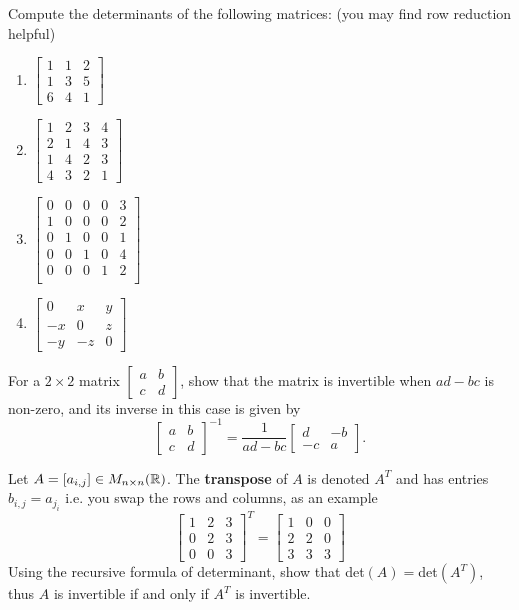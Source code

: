 \begin{exerciselist}
	\item Compute the determinants of the following matrices: (you may find row reduction helpful) \begin{enumerate}
		\item $\begin{bmatrix}
			1&1&2\\1&3&5\\6&4&1
		\end{bmatrix}$
		\item $\begin{bmatrix}
			1&2&3&4\\2&1&4&3\\1&4&2&3\\4&3&2&1
		\end{bmatrix}$
		\item $\begin{bmatrix}
			0&0&0&0&3\\
			1&0&0&0&2\\
			0&1&0&0&1\\
			0&0&1&0&4\\
			0&0&0&1&2\\
		\end{bmatrix}$
		\item $\begin{bmatrix}
			0&x&y\\-x&0&z\\-y&-z&0
		\end{bmatrix}$
	\end{enumerate}
	\item For a $2\times 2$ matrix $\begin{bmatrix}
		a&b\\c&d
	\end{bmatrix}$, show that the matrix is invertible when $ad-bc$ is non-zero, and its inverse in this case is given by \[
	\begin{bmatrix}
		a&b\\c&d
	\end{bmatrix}^{-1}=
	\frac{1}{ad-bc}\begin{bmatrix}
		d & -b\\-c& a
	\end{bmatrix}.
	\]
	\item Let $A=[a_{i,j}]\in M_{n\times n}(\mathbb{R})$. The \textbf{transpose} of $A$ is denoted $A^T$ and has entries $b_{i,j}=a_{j_i}$ i.e. you swap the rows and columns, as an example \[
	\begin{bmatrix}
		1&2&3\\0&2&3\\0&0&3
	\end{bmatrix}^T=\begin{bmatrix}
		1&0&0\\2&2&0\\3&3&3
	\end{bmatrix}
	\]
	Using the recursive formula of determinant, show that det$(A)=$det$(A^T)$, thus $A$ is invertible if and only if $A^T$ is invertible.
\end{exerciselist}
